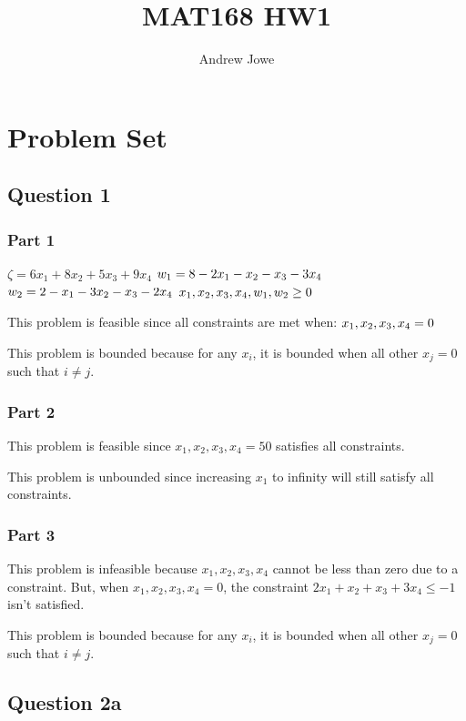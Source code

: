 \documentclass[17pt]{extarticle}
\title{MAT168 HW1}
\author{Andrew Jowe}
\begin{document}
\maketitle
\section*{Problem Set}
\subsection*{Question 1}
\subsubsection*{Part 1}
$\zeta = 6x_1 + 8x_2 + 5x_3 + 9x_4$
$\\ w_1 = 8 - 2x_1 - x_2 - x_3 - 3x_4$
$\\ w_2 = 2 - x_1 - 3x_2 - x_3 - 2x_4$
$\\ x_1, x_2, x_3, x_4, w_1, w_2 \geq 0$

\bigskip This problem is feasible since all constraints are met when:
$\\x_1, x_2, x_3, x_4 = 0$

\bigskip This problem is bounded because for any $x_i$, it is bounded when all other $x_j = 0$ such that $i \neq j$. 

\subsubsection*{Part 2}
This problem is feasible since $x_1, x_2, x_3, x_4 = 50$ satisfies all constraints.

\bigskip This problem is unbounded since increasing $x_1$ to infinity will still satisfy all constraints.

\subsubsection*{Part 3}
This problem is infeasible because $x_1, x_2, x_3, x_4$ cannot be less than zero due to a constraint. But, when $x_1, x_2, x_3, x_4 = 0$, the constraint $2x_1+x_2+x_3+3x_4 \leq -1$ isn't satisfied.

\bigskip This problem is bounded because for any $x_i$, it is bounded when all other $x_j = 0$ such that $i \neq j$.

\newpage
\subsection*{Question 2a}
\end{document}
